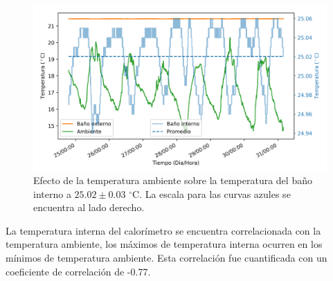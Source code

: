 \documentclass[a0]{sciposter}
\newcommand{\grad}{$^\circ$C}
\newcommand{\figwidth}{0.7\linewidth}
\begin{document}
\begin{multicols}{3}
	\begin{figure}[h]
		\centering
		\includegraphics[width=\figwidth]{../Data/TemperatureStability/temperatureStability}
		\caption{Efecto de la temperatura ambiente sobre la temperatura del baño interno a $25.02\pm0.03$ \grad{}. La escala para las curvas azules se encuentra al lado derecho.}
	\end{figure}
	
	La temperatura interna del calorímetro se encuentra correlacionada con la temperatura ambiente, los máximos de temperatura interna ocurren en los mínimos de temperatura ambiente. Esta correlaci\'on fue cuantificada con un coeficiente de correlaci\'on de -0.77.
	
%	


\end{multicols}
\end{document}

